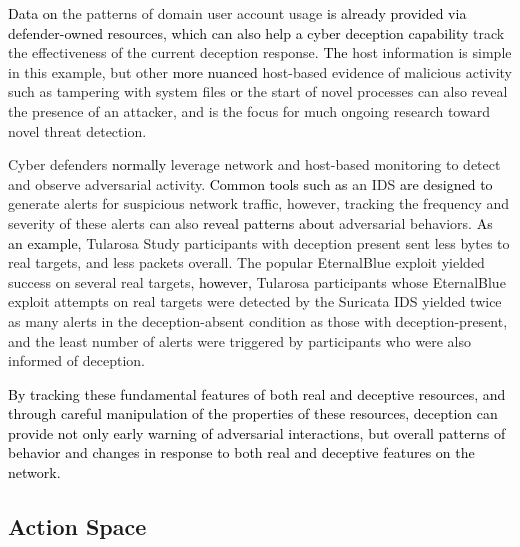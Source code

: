 \documentclass{article}
\newcommand\mmm[1]{\textcolor{black}{#1}}
\newcommand\nnn[1]{\textcolor{black}{#1}}
\begin{document}
\mmm{Data on} the patterns of domain user account usage \mmm{is already provided via defender-owned resources, which can also help a cyber deception capability} track the effectiveness of the current deception response. \mmm{The} host information is simple in this example, but other \mmm{more nuanced} host-based evidence of malicious activity such as tampering with system files or the start of novel processes can also reveal the presence of an attacker, and is the focus for much ongoing research toward novel threat detection.

Cyber defenders \mmm{normally} leverage network and host-based monitoring to detect and observe adversarial activity. \mmm{Common tools such as} an IDS \mmm{are designed to} generate alerts for suspicious network traffic, however, tracking the frequency and severity of these alerts can also \nnn{reveal patterns about} adversarial behaviors. 
\nnn{As an example,} Tularosa Study participants with deception present sent less bytes to real targets, and less packets overall. The popular EternalBlue exploit yielded success on several real targets\nnn{, however,} Tularosa participants whose EternalBlue exploit attempts on real targets were detected by the Suricata IDS yielded twice as many alerts in the deception-absent condition as those with deception-present, and the least number of alerts were triggered by participants who were also informed of deception. 

\nnn{By tracking these fundamental features of both real and deceptive resources, and through careful manipulation of the properties of these resources, deception can provide not only early warning of adversarial interactions, but overall patterns of behavior and changes in response to both real and deceptive features on the network.}


\subsection{Action Space}~\label{sub:action}
\end{document}
